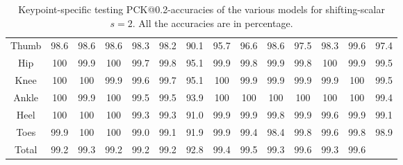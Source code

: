 \documentclass[./main.tex]{subfiles}
\begin{document}
\begin{table}[htbp]
\begin{adjustbox}{center}
\begin{tabular}{c||ccc|ccc|ccc|ccc|c}
            Thumb & 98.6 & 98.6 & 98.6 & 98.3 & 98.2 & 90.1 & 95.7 & 96.6 & 98.6 & 97.5 & 98.3 & 99.6 & 97.4 \\
            Hip & 100 & 99.9 & 100 & 99.7 & 99.8 & 95.1 & 99.9 & 99.8 & 99.9 & 99.8 & 100 & 99.9 & 99.5 \\
            Knee & 100 & 100 & 99.9 & 99.6 & 99.7 & 95.1 & 100 & 99.9 & 99.9 & 99.9 & 99.9 & 100 & 99.5 \\
            Ankle & 100 & 99.9 & 100 & 99.5 & 99.5 & 93.9 & 100 & 100 & 100 & 100 & 100 & 100 & 99.4 \\
            Heel & 100 & 100 & 100 & 99.3 & 99.3 & 91.0 & 99.9 & 99.9 & 99.8 & 99.9 & 99.6 & 99.9 & 99.1 \\
            Toes & 99.9 & 100 & 100 & 99.0 & 99.1 & 91.9 & 99.9 & 99.4 & 98.4 & 99.8 & 99.6 & 99.8 & 98.9 \\
            \hline
            Total & 99.2 & 99.3 & 99.2 & 99.2 & 99.2 & 92.8 & 99.4 & 99.5 & 99.3 & 99.6 & 99.3 & 99.6 & \\
            \hline
        \end{tabular}
    \end{adjustbox}
    \caption{Keypoint-specific testing PCK@0.2-accuracies of the various models for shifting-scalar $s = 2$. All the accuracies are in percentage.}
    \label{tab:finetune_kpts_test_accs_2_2}
\end{table}
\end{document}
